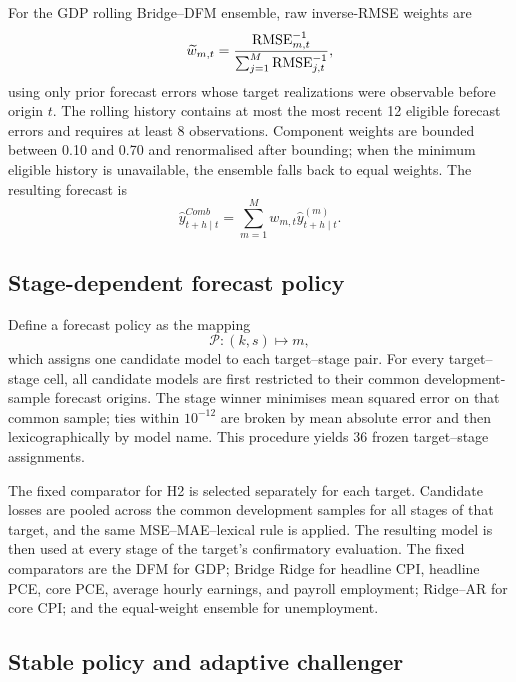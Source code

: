 For the GDP rolling Bridge--DFM ensemble, raw inverse-RMSE weights are
\begin{equation}
    \widetilde w_{m,t}
    =
    \frac{\operatorname{RMSE}_{m,t}^{-1}}
    {\sum_{j=1}^{M}\operatorname{RMSE}_{j,t}^{-1}},
    \label{eq:inverse_rmse_weight}
\end{equation}
using only prior forecast errors whose target realizations were observable
before origin \(t\). The rolling history contains at most the most recent 12
eligible forecast errors and requires at least 8 observations. Component
weights are bounded between 0.10 and 0.70 and renormalised after bounding; when
the minimum eligible history is unavailable, the ensemble falls back to equal
weights. The resulting forecast is
\begin{equation}
    \widehat{y}_{t+h\mid t}^{Comb}
    =
    \sum_{m=1}^{M} w_{m,t}
    \widehat{y}_{t+h\mid t}^{(m)}.
    \label{eq:combined_forecast}
\end{equation}

\subsection{Stage-dependent forecast policy}
\label{subsec:stage_policy}

Define a forecast policy as the mapping
\begin{equation}
    \mathcal{P}:(k,s)\mapsto m,
    \label{eq:policy_mapping}
\end{equation}
which assigns one candidate model to each target--stage pair. For every
target--stage cell, all candidate models are first restricted to their common
development-sample forecast origins. The stage winner minimises mean squared
error on that common sample; ties within \(10^{-12}\) are broken by mean
absolute error and then lexicographically by model name. This procedure yields
36 frozen target--stage assignments.

The fixed comparator for H2 is selected separately for each target. Candidate
losses are pooled across the common development samples for all stages of that
target, and the same MSE--MAE--lexical rule is applied. The resulting model is
then used at every stage of the target's confirmatory evaluation. The fixed
comparators are the DFM for GDP; Bridge Ridge for headline CPI, headline PCE,
core PCE, average hourly earnings, and payroll employment; Ridge--AR for core
CPI; and the equal-weight ensemble for unemployment.

\subsection{Stable policy and adaptive challenger}
\label{subsec:stable_adaptive}

